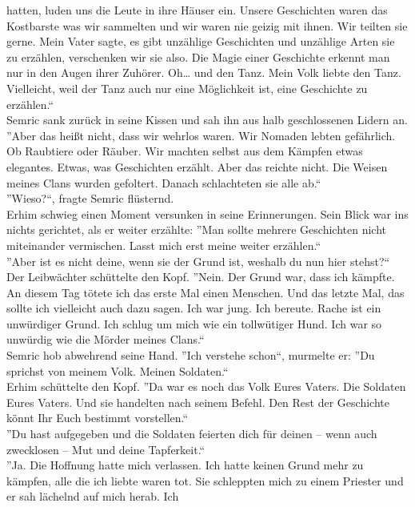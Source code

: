 hatten, luden uns die Leute in ihre Häuser ein. Unsere Geschichten waren das Kostbarste was wir 
sammelten und wir waren nie geizig mit ihnen. Wir teilten sie gerne. Mein Vater sagte, es gibt 
unzählige Geschichten und unzählige Arten sie zu erzählen, verschenken wir sie also. Die Magie 
einer Geschichte erkennt man nur in den Augen ihrer Zuhörer. Oh… und den Tanz. Mein Volk liebte den 
Tanz. Vielleicht, weil der Tanz auch nur eine Möglichkeit ist, eine Geschichte zu erzählen.``\\
Semric sank zurück in seine Kissen und sah ihn aus halb geschlossenen Lidern an. \\
''Aber das heißt nicht, dass wir wehrlos waren. Wir Nomaden lebten gefährlich. Ob Raubtiere oder 
Räuber. Wir machten selbst aus dem Kämpfen etwas elegantes. Etwas, was Geschichten erzählt. Aber 
das reichte nicht. Die Weisen meines Clans wurden gefoltert. Danach schlachteten sie alle ab.``\\
''Wieso?``, fragte Semric flüsternd.\\
Erhim schwieg einen Moment versunken in seine Erinnerungen. Sein Blick war ins nichts gerichtet, 
als 
er weiter erzählte: ''Man sollte mehrere Geschichten nicht miteinander vermischen. Lasst mich erst 
meine weiter erzählen.``\\
''Aber ist es nicht deine, wenn sie der Grund ist, weshalb du nun hier stehst?``\\
Der Leibwächter schüttelte den Kopf. ''Nein. Der Grund war, dass ich kämpfte. An diesem Tag tötete 
ich das erste Mal einen Menschen. Und das letzte Mal, das sollte ich vielleicht auch dazu sagen. 
Ich war jung. Ich bereute. Rache ist ein unwürdiger Grund. Ich schlug um mich wie ein tollwütiger 
Hund. Ich war so unwürdig wie die Mörder meines Clans.``\\
Semric hob abwehrend seine Hand. ''Ich verstehe schon``, murmelte er: ''Du sprichst von meinem 
Volk. 
Meinen Soldaten.``\\
Erhim schüttelte den Kopf. ''Da war es noch das Volk Eures Vaters. Die Soldaten Eures Vaters. Und 
sie 
handelten nach seinem Befehl. Den Rest der Geschichte könnt Ihr Euch bestimmt vorstellen.``\\
''Du hast aufgegeben und die Soldaten feierten dich für deinen – wenn auch zwecklosen – Mut und 
deine 
Tapferkeit.``\\
''Ja. Die Hoffnung hatte mich verlassen. Ich hatte keinen Grund mehr zu kämpfen, alle die ich 
liebte waren tot. Sie schleppten mich zu einem Priester und er sah lächelnd auf mich herab. Ich 
